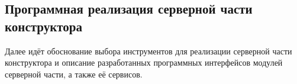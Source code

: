 
\subsection{Программная реализация серверной части конструктора}

Далее идёт обоснование выбора инструментов для реализации серверной части
конструктора и описание
разработанных программных интерфейсов модулей серверной части, а также её сервисов.







